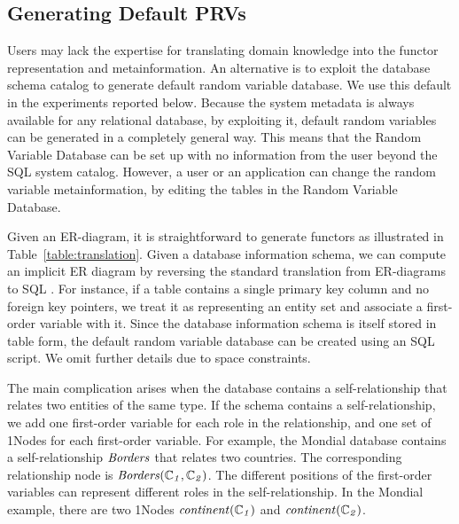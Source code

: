 \documentclass{vldb}
\begin{document}
\subsection{Generating Default PRVs} Users may lack the expertise for translating domain knowledge into the functor representation and metainformation.
An alternative is to exploit the database schema catalog to generate default random variable database.
We use this default in the experiments reported below.  Because the system metadata is always available for any relational database,  by exploiting it, default random variables can be generated in a completely general way. This means that the Random Variable Database can be set up with no information from the user beyond  the SQL system catalog. However, a user or an application can change the random variable metainformation, by editing the tables in the Random Variable Database.

Given an ER-diagram, it is straightforward to generate functors as illustrated in Table~\ref{table:translation}.
 Given a database information schema, we can compute an implicit ER diagram by reversing the standard translation from ER-diagrams to SQL \cite{Ullman1982}.
For instance, if a table contains a single primary key column and no foreign key pointers, we treat it as representing an entity set and associate a first-order variable with it. 
Since the database information schema is itself stored in table form, the default random variable database can be created using an SQL script. 
We omit further details due to space constraints.

The main complication arises when the database contains a self-relationship \cite{Heckerman+al:SRL07} that relates two entities of the same type. If the schema contains a self-relationship, we add one first-order variable for each role in the relationship, and one set of 1Nodes for each first-order variable. 
For example, the Mondial database contains a self-relationship $\it{Borders}$ that relates two countries. 
The corresponding relationship node is $\it{Borders}(\mathbb{C}_{1},\mathbb{C}_{2})$. The different positions of the first-order variables can represent different roles in the self-relationship.
 In the Mondial example, there are two 1Nodes $\it{continent}(\mathbb{C}_{1})$ and $\it{continent}(\mathbb{C}_{2})$.
\end{document}
